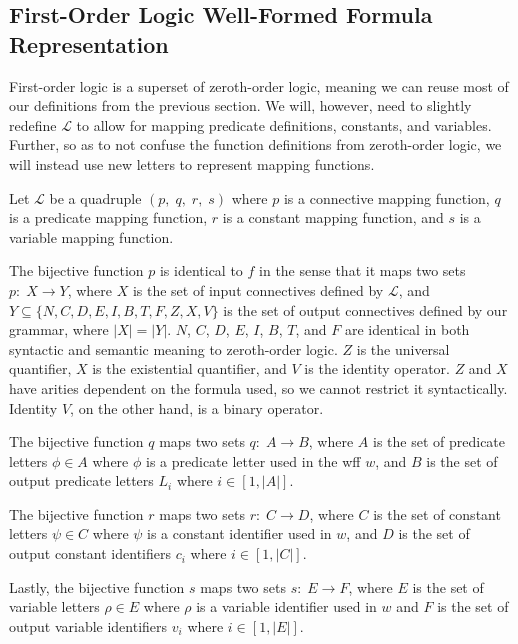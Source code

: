 \documentclass[ms]{uncgdissertationexp2}
\theoremstyle{plain}
\theoremstyle{definition}
\theoremstyle{remark}
\begin{document}
\subsection{First-Order Logic Well-Formed Formula Representation}

First-order logic is a superset of zeroth-order logic, meaning we can reuse most of our definitions from the previous section. We will, however, need to slightly redefine $\mathcal{L}$ to allow for mapping predicate definitions, constants, and variables. Further, so as to not confuse the function definitions from zeroth-order logic, we will instead use new letters to represent mapping functions.

Let $\mathcal{L}$ be a quadruple $(p,\;q,\;r,\;s)$ where $p$ is a connective mapping function, $q$ is a predicate mapping function, $r$ is a constant mapping function, and $s$ is a variable mapping function. 

The bijective function $p$ is identical to $f$ in the sense that it maps two sets $p:\;X \to Y$, where $X$ is the set of input connectives defined by $\mathcal{L}$, and $Y \subseteq \{N, C, D, E, I, B, T, F, Z, X, V\}$ is the set of output connectives defined by our grammar, where $|X| = |Y|$. $N$, $C$, $D$, $E$, $I$, $B$, $T$, and $F$ are identical in both syntactic and semantic meaning to zeroth-order logic. $Z$ is the universal quantifier, $X$ is the existential quantifier, and $V$ is the identity operator. $Z$ and $X$ have arities dependent on the formula used, so we cannot restrict it syntactically. Identity $V$, on the other hand, is a binary operator.

The bijective function $q$ maps two sets $q:\;A \to B$, where $A$ is the set of predicate letters $\phi \in A$ where $\phi$ is a predicate letter used in the wff $w$, and $B$ is the set of output predicate letters $L_{i}$ where $i \in [1, |A|]$.

The bijective function $r$ maps two sets $r:\;C \to D$, where $C$ is the set of constant letters $\psi \in C$ where $\psi$ is a constant identifier used in $w$, and $D$ is the set of output constant identifiers $c_{i}$ where $i \in [1, |C|]$.

Lastly, the bijective function $s$ maps two sets $s:\;E \to F$, where $E$ is the set of variable letters $\rho \in E$ where $\rho$ is a variable identifier used in $w$ and $F$ is the set of output variable identifiers $v_{i}$ where $i \in [1, |E|]$.
\end{document}

